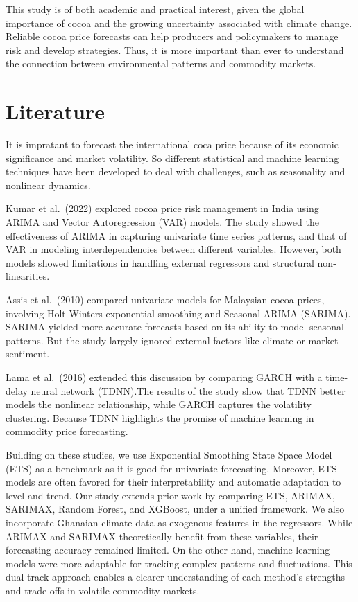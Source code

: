 \documentclass[
  letterpaper,
  DIV=11,
  numbers=noendperiod]{scrartcl}
\begin{document}
This study is of both academic and practical interest, given the global
importance of cocoa and the growing uncertainty associated with climate
change. Reliable cocoa price forecasts can help producers and
policymakers to manage risk and develop strategies. Thus, it is more
important than ever to understand the connection between environmental
patterns and commodity markets.

\hypertarget{literature}{%
\section{Literature}\label{literature}}

It is impratant to forecast the international coca price because of its
economic significance and market volatility. So different statistical
and machine learning techniques have been developed to deal with
challenges, such as seasonality and nonlinear dynamics.

Kumar et al.~(2022) explored cocoa price risk management in India using
ARIMA and Vector Autoregression (VAR) models. The study showed the
effectiveness of ARIMA in capturing univariate time series patterns, and
that of VAR in modeling interdependencies between different variables.
However, both models showed limitations in handling external regressors
and structural non-linearities.

Assis et al.~(2010) compared univariate models for Malaysian cocoa
prices, involving Holt-Winters exponential smoothing and Seasonal ARIMA
(SARIMA). SARIMA yielded more accurate forecasts based on its ability to
model seasonal patterns. But the study largely ignored external factors
like climate or market sentiment.

Lama et al.~(2016) extended this discussion by comparing GARCH with a
time-delay neural network (TDNN).The results of the study show that TDNN
better models the nonlinear relationship, while GARCH captures the
volatility clustering. Because TDNN highlights the promise of machine
learning in commodity price forecasting.

Building on these studies, we use Exponential Smoothing State Space
Model (ETS) as a benchmark as it is good for univariate forecasting.
Moreover, ETS models are often favored for their interpretability and
automatic adaptation to level and trend. Our study extends prior work by
comparing ETS, ARIMAX, SARIMAX, Random Forest, and XGBoost, under a
unified framework. We also incorporate Ghanaian climate data as
exogenous features in the regressors. While ARIMAX and SARIMAX
theoretically benefit from these variables, their forecasting accuracy
remained limited. On the other hand, machine learning models were more
adaptable for tracking complex patterns and fluctuations. This
dual-track approach enables a clearer understanding of each method's
strengths and trade-offs in volatile commodity markets.
\end{document}
